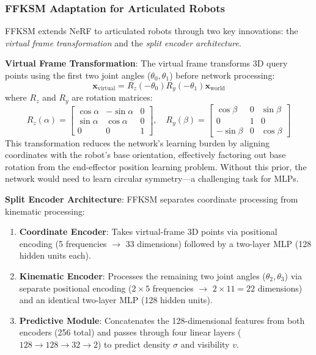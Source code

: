 \documentclass[12pt,a4paper,oneside]{report}
\begin{document}
\subsubsection{FFKSM Adaptation for Articulated Robots}
FFKSM extends NeRF to articulated robots through two key innovations: the \textit{virtual frame transformation} and the \textit{split encoder architecture}.

\textbf{Virtual Frame Transformation}: The virtual frame transforms 3D query points using the first two joint angles ($\theta_0, \theta_1$) before network processing:
\begin{equation}
\mathbf{x}_{\text{virtual}} = R_z(-\theta_0) R_y(-\theta_1) \mathbf{x}_{\text{world}}
\end{equation}
where $R_z$ and $R_y$ are rotation matrices:
\begin{equation}
R_z(\alpha) = \begin{bmatrix}
\cos\alpha & -\sin\alpha & 0 \\
\sin\alpha & \cos\alpha & 0 \\
0 & 0 & 1
\end{bmatrix}, \quad
R_y(\beta) = \begin{bmatrix}
\cos\beta & 0 & \sin\beta \\
0 & 1 & 0 \\
-\sin\beta & 0 & \cos\beta
\end{bmatrix}
\end{equation}
This transformation reduces the network's learning burden by aligning coordinates with the robot's base orientation, effectively factoring out base rotation from the end-effector position learning problem. Without this prior, the network would need to learn circular symmetry---a challenging task for MLPs.

\textbf{Split Encoder Architecture}: FFKSM separates coordinate processing from kinematic processing:
\begin{enumerate}
    \item \textbf{Coordinate Encoder}: Takes virtual-frame 3D points via positional encoding (5 frequencies $\rightarrow$ 33 dimensions) followed by a two-layer MLP (128 hidden units each).
    \item \textbf{Kinematic Encoder}: Processes the remaining two joint angles ($\theta_2, \theta_3$) via separate positional encoding ($2 \times 5$ frequencies $\rightarrow$ $2 \times 11 = 22$ dimensions) and an identical two-layer MLP (128 hidden units).
    \item \textbf{Predictive Module}: Concatenates the 128-dimensional features from both encoders (256 total) and passes through four linear layers ($128 \rightarrow 128 \rightarrow 32 \rightarrow 2$) to predict density $\sigma$ and visibility $v$.
\end{enumerate}
\end{document}
